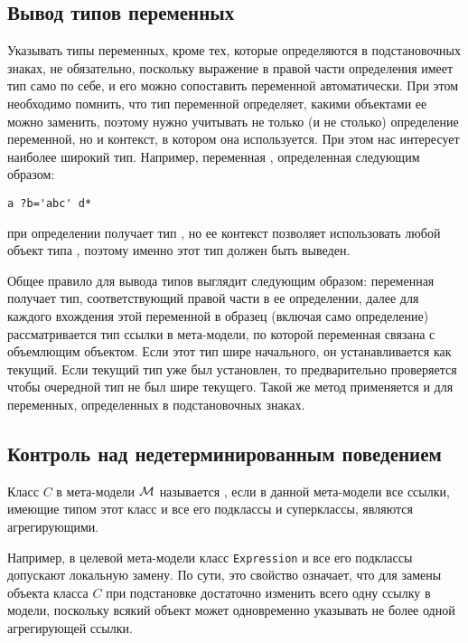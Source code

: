 \subsection{Вывод типов переменных}

Указывать типы переменных, кроме тех, которые определяются в подстановочных знаках, не обязательно, поскольку выражение в правой части определения имеет тип само по себе, и его можно сопоставить переменной автоматически. При этом необходимо помнить, что тип переменной определяет, какими объектами ее можно заменить, поэтому нужно учитывать не только (и не столько) определение переменной, но и контекст, в котором она используется. При этом нас интересует наиболее широкий тип. Например, переменная , определенная следующим образом:
\begin{lstlisting}
a ?b='abc' d*
\end{lstlisting}
при определении получает тип , но ее контекст позволяет использовать любой объект типа , поэтому именно этот тип должен быть выведен.

Общее правило для вывода типов выглядит следующим образом: переменная получает  тип, соответствующий правой части в ее определении, далее для каждого вхождения этой переменной в образец (включая само определение) рассматривается тип ссылки в мета-модели, по которой переменная связана с объемлющим объектом. Если этот тип шире начального, он устанавливается как текущий. Если текущий тип уже был установлен, то предварительно проверяется чтобы очередной тип не был шире текущего. Такой же метод применяется и для переменных, определенных в подстановочных знаках.

\subsection{Контроль над недетерминированным поведением}

\begin{Def}
Класс $C$ в мета-модели $\mathcal{M}$ называется , если в данной мета-модели все ссылки, имеющие типом этот класс и все его подклассы и суперклассы, являются агрегирующими.
\end{Def}
Например, в целевой мета-модели  класс \texttt{Expression} и все его подклассы допускают локальную замену. По сути, это свойство означает, что для замены объекта класса $C$ при подстановке достаточно изменить всего одну ссылку в модели, поскольку всякий объект может одновременно указывать не более одной агрегирующей ссылки.

